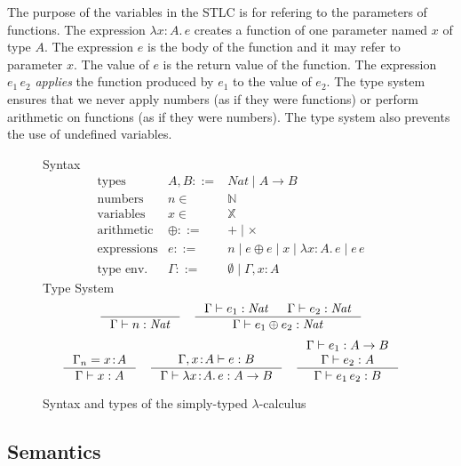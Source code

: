 \documentclass{tufte-handout}
\newcommand{\LAM}[1]{\lambda #1.\,}
\newcommand{\APP}[0]{\,}
\newcommand{\of}[0]{\!:\!}
\newcommand{\NATTY}[0]{\mathit{Nat}}
\newcommand{\VAR}[0]{\mathbb{X}}
\begin{document}
The purpose of the variables in the STLC is for refering to the
parameters of functions. The expression $\LAM{x\of A}e$ creates a
function of one parameter named $x$ of type $A$. The expression $e$ is
the body of the function and it may refer to parameter $x$.  The value
of $e$ is the return value of the function. The expression $e_1 \APP
e_2$ \emph{applies} the function produced by $e_1$ to the value of
$e_2$.  The type system ensures that we never apply numbers (as if
they were functions) or perform arithmetic on functions (as if they
were numbers). The type system also prevents the use of undefined
variables.


\begin{figure}[tbp]
\noindent Syntax
\[
\begin{array}{lrl}
 \text{types} & A,B ::= & \NATTY \mid A \to B \\
 \text{numbers}& n \in & \mathbb{N}  \\
  \text{variables}& x \in & \VAR  \\
 \text{arithmetic} & \oplus ::= & + \mid \times \\
 \text{expressions}& e ::=& n \mid e \oplus e
   \mid x \mid \LAM{x\of A} e \mid e \APP e \\
 \text{type env.} & \Gamma ::= & \emptyset \mid \Gamma,x\of A
\end{array}
\]
Type System
\begin{gather*}
  \inference{}{\Gamma \vdash n : \NATTY}
  \quad
  \inference{\Gamma \vdash e_1 : \NATTY & \Gamma \vdash e_2 : \NATTY}
            {\Gamma \vdash e_1 \oplus e_2 : \NATTY}
  \\[1ex]
  \inference{\Gamma_n = x\of A}{\Gamma \vdash x : A}
  \quad
  \inference{\Gamma,x\of A \vdash e : B}
            {\Gamma \vdash \LAM{x\of A}e : A \to B}
  \quad
  \inference{\Gamma \vdash e_1 : A \to B \\ \Gamma \vdash e_2 : A}
            {\Gamma \vdash e_1 \APP e_2 : B}
\end{gather*}
\caption{Syntax and types of the simply-typed $\lambda$-calculus}
\label{fig:stlc}
\end{figure}

\subsection{Semantics}
\end{document}
